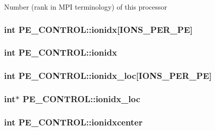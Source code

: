 Number (rank in M\-P\-I terminology) of this processor \hypertarget{struct_p_e___c_o_n_t_r_o_l_a4800c329c9ad9c4af7f318c1daaeadc0}{
\subsubsection[{ionidx}]{\setlength{\rightskip}{0pt plus 5cm}int P\-E\-\_\-\-C\-O\-N\-T\-R\-O\-L\-::ionidx\mbox{[}{\bf I\-O\-N\-S\-\_\-\-P\-E\-R\-\_\-\-P\-E}\mbox{]}}}\label{struct_p_e___c_o_n_t_r_o_l_a4800c329c9ad9c4af7f318c1daaeadc0}
\hypertarget{struct_p_e___c_o_n_t_r_o_l_afbf76e7dcbecc1654adcdf5eaa8e21df}{
\subsubsection[{ionidx}]{\setlength{\rightskip}{0pt plus 5cm}int P\-E\-\_\-\-C\-O\-N\-T\-R\-O\-L\-::ionidx}}\label{struct_p_e___c_o_n_t_r_o_l_afbf76e7dcbecc1654adcdf5eaa8e21df}
\hypertarget{struct_p_e___c_o_n_t_r_o_l_a57dfdf79f99fd0023251c0905652ad9b}{
\subsubsection[{ionidx\-\_\-loc}]{\setlength{\rightskip}{0pt plus 5cm}int P\-E\-\_\-\-C\-O\-N\-T\-R\-O\-L\-::ionidx\-\_\-loc\mbox{[}{\bf I\-O\-N\-S\-\_\-\-P\-E\-R\-\_\-\-P\-E}\mbox{]}}}\label{struct_p_e___c_o_n_t_r_o_l_a57dfdf79f99fd0023251c0905652ad9b}
\hypertarget{struct_p_e___c_o_n_t_r_o_l_ab1147897222421de7b35c7e11f0d7956}{
\subsubsection[{ionidx\-\_\-loc}]{\setlength{\rightskip}{0pt plus 5cm}int$\ast$ P\-E\-\_\-\-C\-O\-N\-T\-R\-O\-L\-::ionidx\-\_\-loc}}\label{struct_p_e___c_o_n_t_r_o_l_ab1147897222421de7b35c7e11f0d7956}
\hypertarget{struct_p_e___c_o_n_t_r_o_l_a06b8104a8a2fa2fb979c79ac9bb44925}{
\subsubsection[{ionidxcenter}]{\setlength{\rightskip}{0pt plus 5cm}int P\-E\-\_\-\-C\-O\-N\-T\-R\-O\-L\-::ionidxcenter}}\label{struct_p_e___c_o_n_t_r_o_l_a06b8104a8a2fa2fb979c79ac9bb44925}
